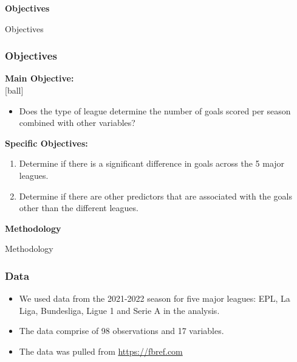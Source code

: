 \documentclass[11pt]{beamer}
\begin{document}
 \begin{frame}
 \color{blue}
    \begin{center}
        \Huge\textbf{Objectives}
    \end{center}
	\end{frame}

	\begin{frame}{Objectives}
		\frametitle{Objectives}
      \textbf{Main Objective:}\\
      [ball]
      \begin{itemize}
          \item  Does the type of league determine the number of goals scored per season combined with other variables?\\
      \end{itemize}
         
        \textbf{Specific Objectives:}
		\begin{enumerate}
		 
			
			\item Determine if there is a significant difference in goals across the 5 major leagues.
			
			\item Determine if there are other predictors that are associated with the goals other than the different leagues.
			
		\end{enumerate}
	\end{frame}


\begin{frame}
\color{blue}
    \begin{center}
        \Huge\textbf{Methodology}
    \end{center}
	\end{frame}
	\begin{frame}{Methodology}
		\frametitle{Data}
  \begin{itemize}
  \setlength\itemsep{3em}
		\item We used data from the
		2021-2022 season for five major leagues: EPL, La Liga, Bundesliga, Ligue 1 and Serie A in the analysis.
        \item The data comprise of 98 observations and 17 variables.
        
        \item The data was pulled from \url{ https://fbref.com} 
		 

	\end{itemize}

 \end{frame}
 
\end{document}
